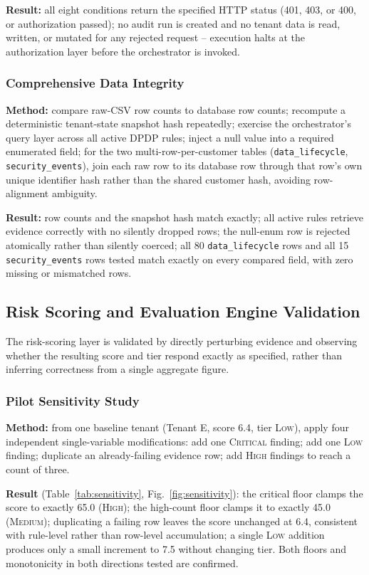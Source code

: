 \documentclass[11pt,a4paper]{article}
\begin{document}
\textbf{Result:} all eight conditions return the specified HTTP status (401, 403, or 400, or authorization passed); no audit run is created and no tenant data is read, written, or mutated for any rejected request -- execution halts at the authorization layer before the orchestrator is invoked.

\subsubsection{Comprehensive Data Integrity}
\label{sec:integrity}
\textbf{Method:} compare raw-CSV row counts to database row counts; recompute a deterministic tenant-state snapshot hash repeatedly; exercise the orchestrator's query layer across all active DPDP rules; inject a null value into a required enumerated field; for the two multi-row-per-customer tables (\texttt{data\_lifecycle}, \texttt{security\_events}), join each raw row to its database row through that row's own unique identifier hash rather than the shared customer hash, avoiding row-alignment ambiguity.

\textbf{Result:} row counts and the snapshot hash match exactly; all active rules retrieve evidence correctly with no silently dropped rows; the null-enum row is rejected atomically rather than silently coerced; all 80 \texttt{data\_lifecycle} rows and all 15 \texttt{security\_events} rows tested match exactly on every compared field, with zero missing or mismatched rows.

\subsection{Risk Scoring and Evaluation Engine Validation}
\label{sec:riskscoring}
The risk-scoring layer is validated by directly perturbing evidence and observing whether the resulting score and tier respond exactly as specified, rather than inferring correctness from a single aggregate figure.

\subsubsection{Pilot Sensitivity Study}
\label{sec:sensitivity}
\textbf{Method:} from one baseline tenant (Tenant E, score 6.4, tier \textsc{Low}), apply four independent single-variable modifications: add one \textsc{Critical} finding; add one \textsc{Low} finding; duplicate an already-failing evidence row; add \textsc{High} findings to reach a count of three.

\textbf{Result} (Table~\ref{tab:sensitivity}, Fig.~\ref{fig:sensitivity}): the critical floor clamps the score to exactly 65.0 (\textsc{High}); the high-count floor clamps it to exactly 45.0 (\textsc{Medium}); duplicating a failing row leaves the score unchanged at 6.4, consistent with rule-level rather than row-level accumulation; a single \textsc{Low} addition produces only a small increment to 7.5 without changing tier. Both floors and monotonicity in both directions tested are confirmed.
\end{document}
